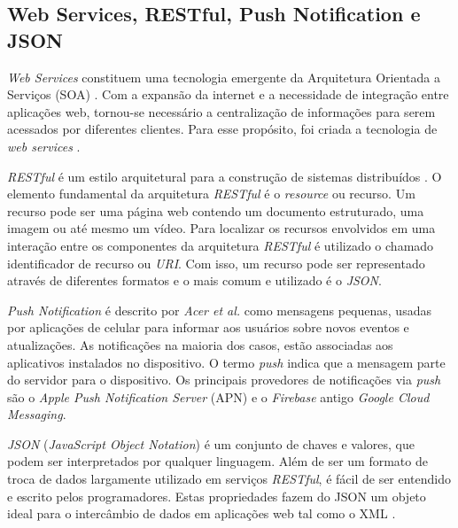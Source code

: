 \subsection{Web Services, RESTful, Push Notification e JSON} %
\textit{Web Services} constituem uma tecnologia emergente da Arquitetura Orientada a Serviços (SOA) \cite{perepletchikov}. Com a expansão da internet e a necessidade de integração entre aplicações web, tornou-se necessário a centralização de informações para serem acessados por diferentes clientes. Para esse propósito, foi criada a tecnologia de \textit{web services} \cite{ibm_research}. 

\textit{RESTful} é um estilo arquitetural para a construção de sistemas distribuídos \cite{fielding}. O elemento fundamental da arquitetura \textit{RESTful} é o \textit{resource} ou recurso. Um recurso pode ser uma página web contendo um documento estruturado, uma imagem ou até mesmo um vídeo. Para localizar os recursos envolvidos em uma interação entre os componentes da arquitetura \textit{RESTful} é utilizado o chamado identificador de recurso ou \textit{URI}. Com isso, um recurso pode ser representado através de diferentes formatos e o mais comum e utilizado é o \textit{JSON}.


\textit{Push Notification} é descrito por \textit{Acer et al.} \cite{Acer:2015:EES:2902314.2902344} como mensagens pequenas, usadas por aplicações de celular para informar aos usuários sobre novos eventos e atualizações. As notificações na maioria dos casos, estão associadas aos aplicativos instalados no dispositivo. O termo \textit{push} indica que a mensagem parte do servidor para o dispositivo. Os principais provedores de notificações via \textit{push} são o \textit{Apple Push Notification Server} (APN) e o \textit{Firebase} antigo \textit{Google Cloud Messaging}.


\textit{JSON} (\textit{JavaScript Object Notation}) é um conjunto de chaves e valores, que podem
ser interpretados por qualquer linguagem. Além de ser um formato de troca de dados largamente utilizado em serviços \textit{RESTful}, é fácil de ser entendido e escrito pelos programadores. Estas propriedades fazem do JSON um objeto ideal para o intercâmbio de dados em aplicações web tal como o XML \cite{jun_y_zhishu}.